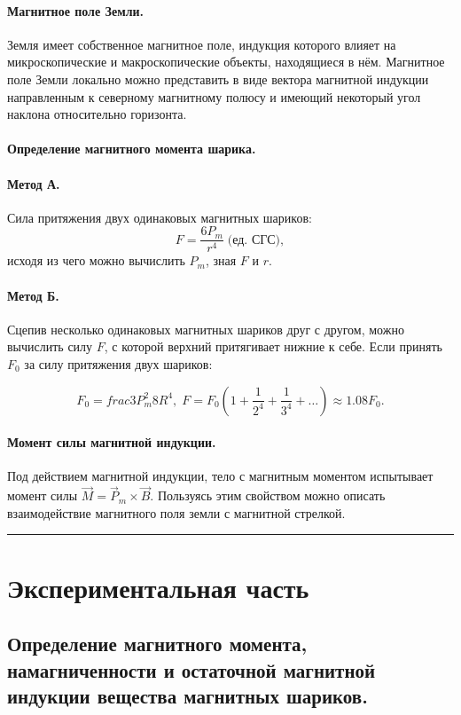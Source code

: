 \documentclass[a4paper,12pt]{article} %
\begin{document}
\paragraph{Магнитное поле Земли.} Земля имеет собственное магнитное поле, индукция которого влияет на микроскопические и макроскопические объекты, находящиеся в нём. Магнитное поле Земли локально можно представить в виде вектора магнитной индукции направленным к северному магнитному полюсу и имеющий некоторый угол наклона относительно горизонта.

\paragraph{Определение магнитного момента шарика.}
\paragraph{Метод А.} Сила притяжения двух одинаковых магнитных шариков:
\[ F = \frac{6P_m}{r^4} \; \text{(ед. СГС)}, \]
исходя из чего можно вычислить $P_m$, зная $F$ и $r$. 
\paragraph{Метод Б.} Сцепив несколько одинаковых магнитных шариков друг с другом, можно вычислить силу $F$, с которой верхний притягивает нижние к себе. Если принять $F_0$ за силу притяжения двух шариков:

\[ F_0 =frac{3P_m^2}{8R^4}, \; F = F_0 \left( 1 + \frac{1}{2^4} + \frac{1}{3^4} + \hdots \right) \approx 1.08 F_0. \]

\paragraph{Момент силы магнитной индукции.} Под действием магнитной индукции, тело с магнитным моментом испытывает момент силы $\vec{M} = \vec{P}_m \times \vec{B}$. Пользуясь этим свойством можно описать взаимодействие магнитного поля земли с магнитной стрелкой.


\medskip\hrule\medskip

\section{Экспериментальная часть}

\subsection{Определение магнитного момента, намагниченности и остаточной магнитной индукции вещества магнитных шариков.}
\end{document}
